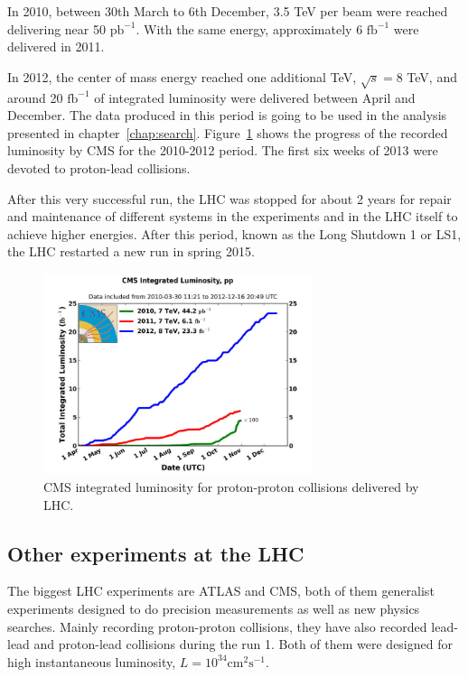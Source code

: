 In 2010, between 30th March to 6th December, 3.5 TeV per beam were reached delivering near 50 $\text{pb}^{-1}$. With the same energy, approximately 6 $\text{fb}^{-1}$ were delivered in 2011. 

In 2012, the center of mass energy reached one additional TeV, $\sqrt{s}=8$ TeV, and around 20 $\text{fb}^{-1}$ of integrated luminosity were delivered between April and December. The data produced in this period is going to be used in the analysis presented in chapter~\ref{chap:search}. Figure~\ref{fig:CMSlumi} shows the progress of the recorded luminosity by CMS for the 2010-2012 period. The first six weeks of 2013 were devoted to proton-lead collisions.

After this very successful run, the LHC was stopped for about 2 years for repair and maintenance of different systems in the experiments and in the LHC itself to achieve higher energies. After this period, known as the Long Shutdown 1 or LS1, the LHC restarted a new run in spring 2015.

\begin{figure}[!Hhtbp]
  \begin{center}
    \includegraphics[width=0.7\textwidth]{figs/cms-int-10to12.jpg}
    \caption{CMS integrated luminosity for proton-proton collisions delivered by LHC. }
    \label{fig:CMSlumi}
  \end{center}
\end{figure}

\subsection{Other experiments at the LHC}
\label{sec:expers}

The biggest LHC experiments are ATLAS and CMS, both of them generalist experiments designed to do precision measurements as well as new physics searches. Mainly recording proton-proton collisions, they have also recorded lead-lead and proton-lead collisions during the run 1. Both of them were designed for high instantaneous luminosity, $L = 10^{34}\text{cm}^{2}\text{s}^{-1}$.

